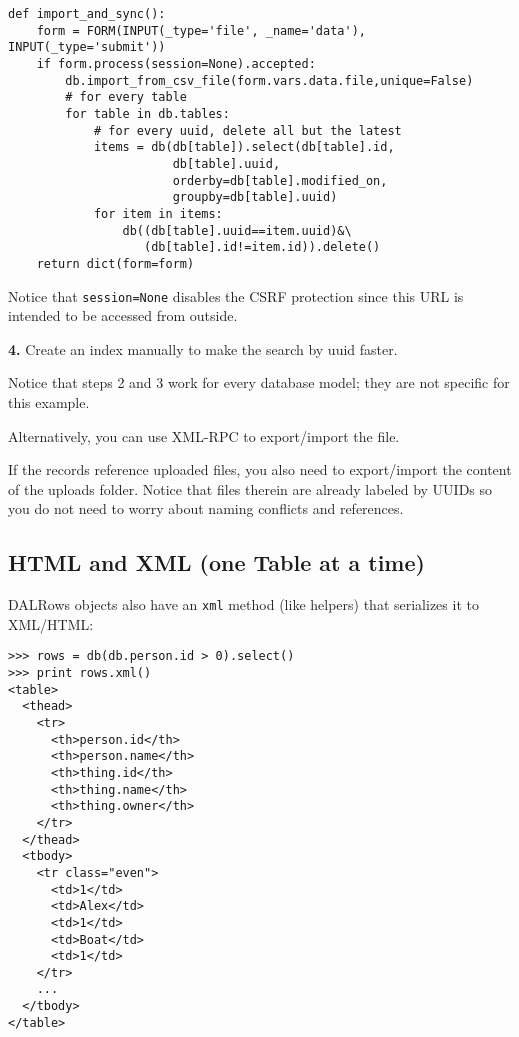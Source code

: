 \documentclass[justified,sixbynine,notoc]{tufte-book}
\def\ft{\small\tt}
\def\inxx#1{\index{#1}}
\begin{document}
\begin{fullwidth}
\begin{lstlisting}
def import_and_sync():
    form = FORM(INPUT(_type='file', _name='data'), INPUT(_type='submit'))
    if form.process(session=None).accepted:
        db.import_from_csv_file(form.vars.data.file,unique=False)
        # for every table
        for table in db.tables:
            # for every uuid, delete all but the latest
            items = db(db[table]).select(db[table].id,
                       db[table].uuid,
                       orderby=db[table].modified_on,
                       groupby=db[table].uuid)
            for item in items:
                db((db[table].uuid==item.uuid)&\
                   (db[table].id!=item.id)).delete()
    return dict(form=form)
\end{lstlisting}

Notice that {\ft session=None} disables the CSRF protection since this URL is intended to be accessed from outside.

{\bf 4.} Create an index manually to make the search by uuid faster.

Notice that steps 2 and 3 work for every database model; they are not
specific for this example.

\inxx{XML-RPC}
Alternatively, you can use XML-RPC to export/import the file.

If the records reference uploaded files, you also need to export/import the content of the uploads folder. Notice that files therein are already labeled by UUIDs so you do not need to worry about naming conflicts and references.

\goodbreak\subsection{HTML and XML (one Table at a time)}

\inxx{DALRows objects}
DALRows objects also have an {\ft xml} method (like helpers) that serializes it to XML/HTML:

\inxx{HTML}

\begin{lstlisting}
>>> rows = db(db.person.id > 0).select()
>>> print rows.xml()
<table>
  <thead>
    <tr>
      <th>person.id</th>
      <th>person.name</th>
      <th>thing.id</th>
      <th>thing.name</th>
      <th>thing.owner</th>
    </tr>
  </thead>
  <tbody>
    <tr class="even">
      <td>1</td>
      <td>Alex</td>
      <td>1</td>
      <td>Boat</td>
      <td>1</td>
    </tr>
    ...
  </tbody>
</table>
\end{lstlisting}


\end{fullwidth}
\end{document}
